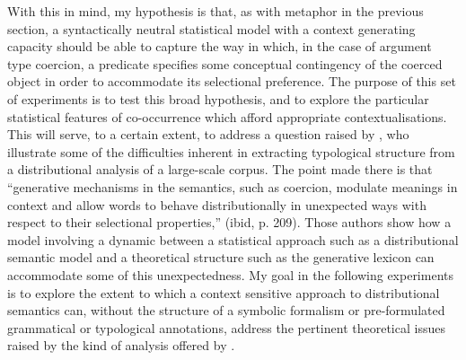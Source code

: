 With this in mind, my hypothesis is that, as with metaphor in the previous section, a syntactically neutral statistical model with a context generating capacity should be able to capture the way in which, in the case of argument type coercion, a predicate specifies some conceptual contingency of the coerced object in order to accommodate its selectional preference.  The purpose of this set of experiments \citep[an early version of which is reported in][]{McGregorEA2017} is to test this broad hypothesis, and to explore the particular statistical features of co-occurrence which afford appropriate contextualisations.  This will serve, to a certain extent, to address a question raised by \cite{PustejovskyEA2008}, who illustrate some of the difficulties inherent in extracting typological structure from a distributional analysis of a large-scale corpus.  The point made there is that ``generative mechanisms in the semantics, such as coercion, modulate meanings in context and allow words to behave distributionally in unexpected ways with respect to their selectional properties,'' (ibid, p. 209).  Those authors show how a model involving a dynamic between a statistical approach such as a distributional semantic model and a theoretical structure such as the generative lexicon can accommodate some of this unexpectedness.  My goal in the following experiments is to explore the extent to which a context sensitive approach to distributional semantics can, without the structure of a symbolic formalism or pre-formulated grammatical or typological annotations, address the pertinent theoretical issues raised by the kind of analysis offered by \citeauthor{PustejovskyEA2008}.

